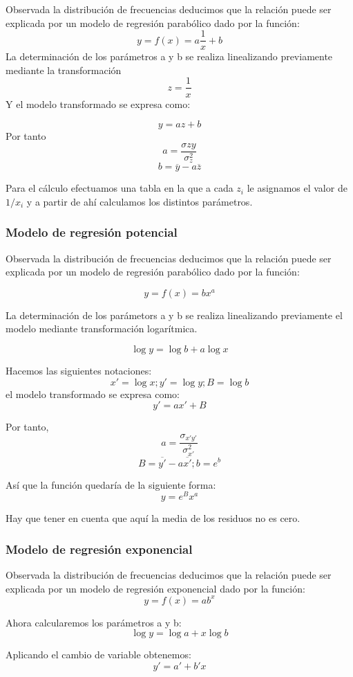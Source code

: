\documentclass{article}
\theoremstyle{definition}
\begin{document}
Observada la distribución de frecuencias deducimos que la relación puede ser
explicada por un modelo de regresión parabólico dado por la función: $$ y= f(x) =
a\frac{1}{x} + b $$ La determinación de los parámetros a y b se realiza
linealizando previamente mediante la transformación  $$ z = \frac{1}{x} $$ Y el
modelo transformado se expresa como:

$$ y = az +b $$ Por tanto $$ a = \frac{\sigma{zy} }{\sigma_{z}^2} $$  $$ b =
\overline{y} - a \overline{z} $$

Para el cálculo efectuamos una tabla en la que a cada $z_i$ le asignamos el
valor de $1/x_i$ y a partir de ahí calculamos los distintos parámetros.

\subsubsection{Modelo de regresión potencial}

Observada la distribución de frecuencias deducimos que la relación puede ser
explicada por un modelo de regresión parabólico dado por la función:

$$ y = f(x) = bx^a $$

La determinación de los parámetors a y b se realiza linealizando previamente el
modelo mediante transformación logarítmica.

$$ \log y = \log b + a\log x $$

	Hacemos las siguientes notaciones: $$x' = \log x; y' = \log y ; B = \log b $$
	el modelo transformado se expresa como: $$y' = ax' + B $$

	Por tanto,
	$$ a = \frac{\sigma_{x'y'} }{\sigma_{x'}^2}$$
	$$ B = \overline{y'} - a\overline{x'} ; b = e^{b} $$

  Así que la función quedaría de la siguiente forma:
	$$ y = e^{B}x^{a} $$

	Hay que tener en cuenta que aquí la media de los residuos no es cero.

\subsubsection{Modelo de regresión exponencial}
	Observada la distribución de frecuencias deducimos que la relación puede ser explicada por un modelo de regresión exponencial dado por la función:
  $$ y = f(x) = ab^{x} $$

	Ahora calcularemos los parámetros a y b:
	$$ \log y = \log a + x\log b $$

	Aplicando el cambio de variable obtenemos:
	$$ y' = a' + b'x $$
\end{document}
